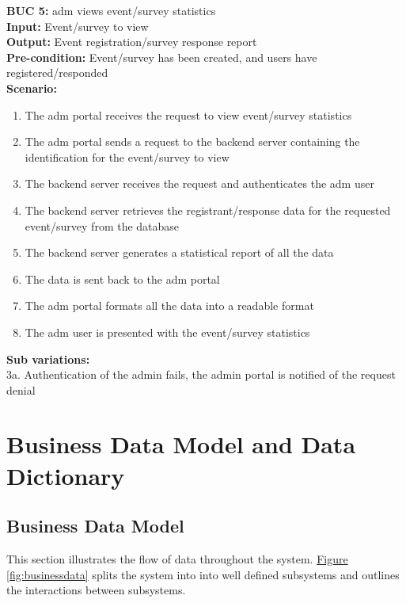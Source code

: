 \documentclass[12pt]{article}
\begin{document}
\noindent\textbf{BUC 5: } \Gls{adm} views event/survey statistics \\
\textbf{Input:} Event/survey to view \\
\textbf{Output:} Event registration/survey response report \\
\textbf{Pre-condition:} Event/survey has been created, and users have registered/responded \\
\textbf{Scenario:} \\
\begin{enumerate}
  \item The \gls{adm} portal receives the request to view event/survey statistics
  \item The \gls{adm} portal sends a request to the backend server containing the identification for the event/survey to view
  \item The backend server receives the request and authenticates the \gls{adm} user
  \item The backend server retrieves the registrant/response data for the requested event/survey from the database
  \item The backend server generates a statistical report of all the data
  \item The data is sent back to the \gls{adm} portal
  \item The \gls{adm} portal formats all the data into a readable format
  \item The \gls{adm} user is presented with the event/survey statistics
\end{enumerate}
\textbf{Sub variations:} \\
3a. Authentication of the admin fails, the admin portal is notified of the request denial \\


\section{Business Data Model and Data Dictionary}
\subsection{Business Data Model}

This section illustrates the flow of data throughout the system. \hyperref[fig:businessdata]{Figure \ref{fig:businessdata}} splits the system into into well defined subsystems and outlines the interactions between subsystems. 
\end{document}
